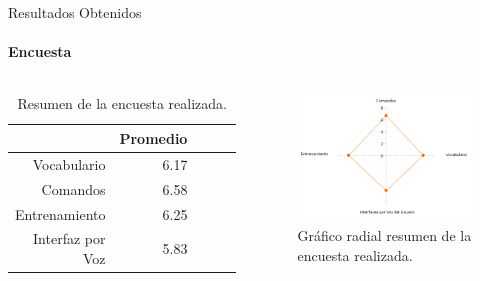 \begin{frame}{Resultados Obtenidos}
\framesubtitle{Encuesta}
\begin{columns}
\begin{table}[H] 
\centering
\tiny
\begin{tabular}{|r|r|r|r|r|}
\hline
            & Promedio \\
\hline
Vocabulario    & 6.17 \\
Comandos    & 6.58 \\
Entrenamiento  & 6.25 \\
Interfaz por Voz & 5.83 \\
\hline
\end{tabular}
\caption{Resumen de la encuesta realizada.}
\label{sec:tabla-encuesta}
\end{table} 
\begin{figure}[ht]
\centering
\includegraphics[width=1\linewidth]{./graphics/kiviat0.png}
\caption{Gr\'afico radial resumen de la encuesta realizada.}
\label{figure:kiviat-encuesta1}
\end{figure}
\end{columns}
\end{frame}


